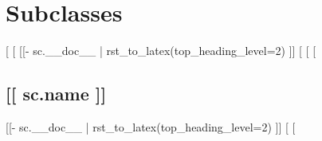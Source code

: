 
\section*{Subclasses}
[%
  [%
    \DndFeatHeader{[[ sc.name ]]} %
    [[- sc.__doc__ | rst_to_latex(top_heading_level=2) ]]
    [%
[%
    [%
    \subsection*{[[ sc.name ]]}
    [[- sc.__doc__ | rst_to_latex(top_heading_level=2) ]]
    [%
[%
